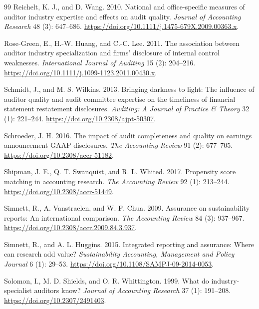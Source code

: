 \documentclass[11pt]{article}
\begin{document}
\begin{thebibliography}{99}
Reichelt, K. J., and D. Wang. 2010.
National and office-specific measures of auditor industry expertise and effects on audit quality.
\textit{Journal of Accounting Research} 48 (3): 647--686. \url{https://doi.org/10.1111/j.1475-679X.2009.00363.x}.

Rose-Green, E., H.-W. Huang, and C.-C. Lee. 2011.
The association between auditor industry specialization and firms' disclosure of internal control weaknesses.
\textit{International Journal of Auditing} 15 (2): 204--216. \url{https://doi.org/10.1111/j.1099-1123.2011.00430.x}.

Schmidt, J., and M. S. Wilkins. 2013.
Bringing darkness to light: The influence of auditor quality and audit committee expertise on the timeliness of financial statement restatement disclosures.
\textit{Auditing: A Journal of Practice \& Theory} 32 (1): 221--244. \url{https://doi.org/10.2308/ajpt-50307}.

Schroeder, J. H. 2016.
The impact of audit completeness and quality on earnings announcement GAAP disclosures.
\textit{The Accounting Review} 91 (2): 677--705. \url{https://doi.org/10.2308/accr-51182}.

Shipman, J. E., Q. T. Swanquist, and R. L. Whited. 2017.
Propensity score matching in accounting research.
\textit{The Accounting Review} 92 (1): 213--244. \url{https://doi.org/10.2308/accr-51449}.

Simnett, R., A. Vanstraelen, and W. F. Chua. 2009.
Assurance on sustainability reports: An international comparison.
\textit{The Accounting Review} 84 (3): 937--967. \url{https://doi.org/10.2308/accr.2009.84.3.937}.

Simnett, R., and A. L. Huggins. 2015.
Integrated reporting and assurance: Where can research add value?
\textit{Sustainability Accounting, Management and Policy Journal} 6 (1): 29--53. \url{https://doi.org/10.1108/SAMPJ-09-2014-0053}.

Solomon, I., M. D. Shields, and O. R. Whittington. 1999.
What do industry-specialist auditors know?
\textit{Journal of Accounting Research} 37 (1): 191--208. \url{https://doi.org/10.2307/2491403}.


\end{thebibliography}
\end{document}
